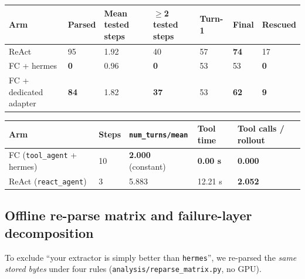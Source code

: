 \begin{center}
\begin{minipage}{\linewidth}
\centering
\small
{}\label{tab:repair}
\begin{tabular}{@{}lllllll@{}}
\toprule
Arm & Parsed & Mean tested steps & $\geq$2 tested steps & Turn-1 & Final & Rescued \\
\midrule
ReAct & 95 & 1.92 & 40 & 57 & \textbf{74} & 17 \\
FC + hermes & \textbf{0} & 0.96 & \textbf{0} & 53 & 53 & \textbf{0} \\
FC + dedicated adapter & \textbf{84} & 1.82 & \textbf{37} & 53 & \textbf{62} & \textbf{9} \\
\bottomrule
\end{tabular}
\end{minipage}
\end{center}
\begin{center}
\begin{minipage}{\linewidth}
\centering
\small
{}\label{tab:training}
\begin{tabular}{@{}lllll@{}}
\toprule
Arm & Steps & \texttt{num\_turns/mean} & Tool time & Tool calls / rollout \\
\midrule
FC (\texttt{tool\_agent} + hermes) & 10 & \textbf{2.000} (constant) & \textbf{0.00 s} & \textbf{0.000} \\
ReAct (\texttt{react\_agent}) & 3 & 5.883 & 12.21 s & \textbf{2.052} \\
\bottomrule
\end{tabular}
\end{minipage}
\end{center}

\subsection{Offline re-parse matrix and failure-layer decomposition}
\label{app:reparse}

To exclude ``your extractor is simply better than \texttt{hermes}'', we re-parsed the
\emph{same stored bytes} under four rules (\texttt{analysis/reparse\_matrix.py}, no GPU).

